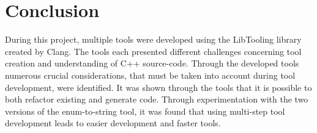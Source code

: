 \chapter{Conclusion}

During this project, multiple tools were developed using the LibTooling library created by Clang. 
The tools each presented different challenges concerning tool creation and understanding of C++ source-code. 
Through the developed tools numerous crucial considerations, that must be taken into account during tool development, were identified.
It was shown through the tools that it is possible to both refactor existing and generate code.
Through experimentation with the two versions of the enum-to-string tool, it was found that using multi-step tool development leads to easier development and faster tools.
